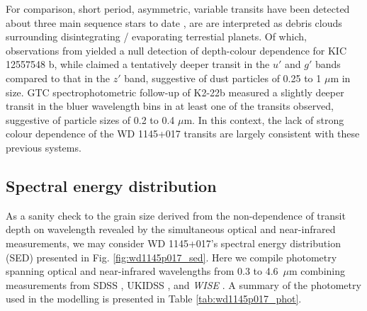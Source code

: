 \documentclass[iop,useAMES,usenatbig]{emulateapj}
\begin{document}
For comparison, short period, asymmetric, variable transits have been detected about three main sequence stars to date \citep{2012ApJ...752....1R,2014ApJ...784...40R,2015ApJ...812..112S}, are are interpreted as debris clouds surrounding disintegrating / evaporating terrestial planets. Of which, observations from \citet{2014ApJ...786..100C} yielded a null detection of depth-colour dependence for KIC 12557548 b, while \citet{2015ApJ...800L..21B} claimed a tentatively deeper transit in the $u'$ and $g'$ bands compared to that in the $z'$ band, suggestive of dust particles of 0.25 to 1 $\mu$m in size. GTC spectrophotometric follow-up of K2-22b measured a slightly deeper transit in the bluer wavelength bins in at least one of the transits observed, suggestive of particle sizes of 0.2 to 0.4 $\mu$m. In this context, the lack of strong colour dependence of the WD 1145+017 transits are largely consistent with these previous systems.

\subsection{Spectral energy distribution}

As a sanity check to the grain size derived from the non-dependence of transit depth on wavelength revealed by the simultaneous optical and near-infrared measurements, we may consider WD 1145+017's spectral energy distribution (SED) presented in Fig. \ref{fig:wd1145p017_sed}. Here we compile photometry spanning optical and near-infrared wavelengths from 0.3 to 4.6~$\mu$m combining measurements from SDSS \citep[$ugriz$;][]{2011ApJS..193...29A}, UKIDSS \citep[$YJHK$;][]{2007MNRAS.379.1599L}, and \textit{WISE} \citep[W1 and W2 -- W3 and W4 are upper limits that do not constrain the SED;][]{2010AJ....140.1868W}. A summary of the photometry used in the modelling is presented in Table \ref{tab:wd1145p017_phot}. 
\end{document}
